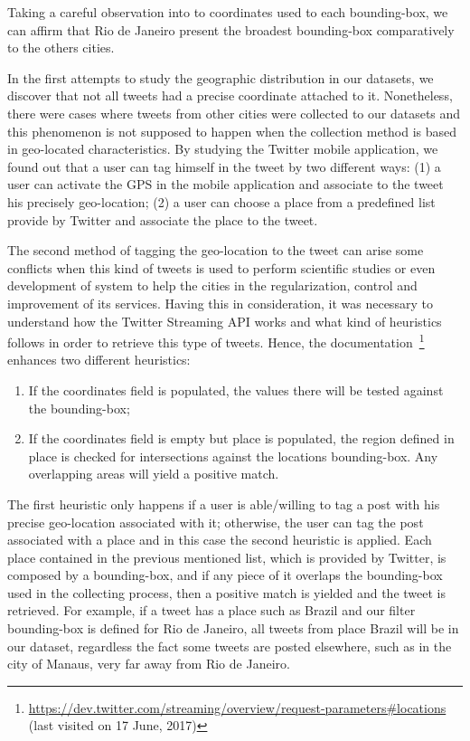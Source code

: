 Taking a careful observation into to coordinates used to each bounding-box, we can affirm that Rio de Janeiro present the broadest bounding-box comparatively to the others cities.

In the first attempts to study the geographic distribution in our datasets, we discover that not all tweets had a precise coordinate attached to it. Nonetheless, there were cases where tweets from other cities were collected to our datasets and this phenomenon is not supposed to happen when the collection method is based in geo-located characteristics. By studying the Twitter mobile application, we found out that a user can tag himself in the tweet by two different ways: (1) a user can activate the GPS in the mobile application and associate to the tweet his precisely geo-location; (2) a user can choose a place from a predefined list provide by Twitter and associate the place to the tweet.

The second method of tagging the geo-location to the tweet can arise some conflicts when this kind of tweets is used to perform scientific studies or even development of system to help the cities in the regularization, control and improvement of its services. Having this in consideration, it was necessary to understand how the Twitter Streaming API works and what kind of heuristics follows in order to retrieve this type of tweets. Hence, the documentation~\footnote{\url{https://dev.twitter.com/streaming/overview/request-parameters\#locations} (last visited on 17 June, 2017)} enhances two different heuristics:

\begin{enumerate}
	\item If the coordinates field is populated, the values there will be tested against the bounding-box;
	\item If the coordinates field is empty but place is populated, the region defined in place is checked for intersections against the locations bounding-box. Any overlapping areas will yield a positive match.
\end{enumerate}

The first heuristic only happens if a user is able/willing to tag a post with his precise geo-location associated with it; otherwise, the user can tag the post associated with a place and in this case the second heuristic is applied. 
Each place contained in the previous mentioned list, which is provided by Twitter, is composed by a bounding-box, and if any piece of it overlaps the bounding-box used in the collecting process, then a positive match is yielded and the tweet is retrieved. For example, if a tweet has a place such as Brazil and our filter bounding-box is defined for Rio de Janeiro, all tweets from place Brazil will be in our dataset, regardless the fact some tweets are posted elsewhere, such as in the city of Manaus, very far away from Rio de Janeiro.

